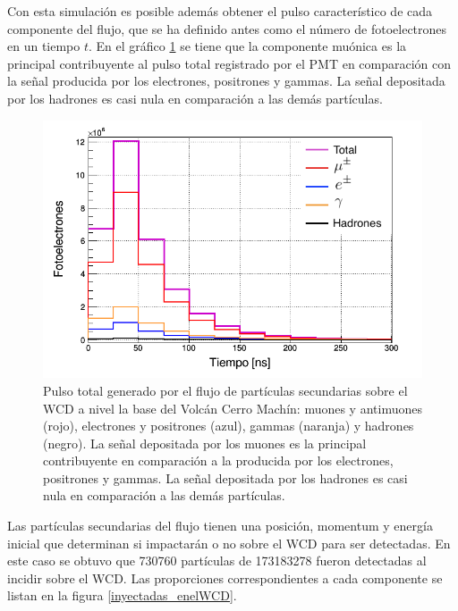 \documentclass[12pt,oneside,openany,letter]{book}
\begin{document}
Con esta simulación es posible además obtener el pulso característico de cada componente del flujo, que se ha definido antes como el número de fotoelectrones en un tiempo $t$. En el gráfico \ref{pulso_flujo} se tiene que la componente muónica es la principal contribuyente al pulso total registrado por el PMT en comparación con la señal producida por los electrones, positrones y gammas. La señal depositada por los hadrones es casi nula en comparación a las demás partículas.
\begin{figure}[h]
\centering
\includegraphics[scale=0.45]{images/pulso_flujo.png}
\caption[Pulso total generado por el flujo de partículas secundarias sobre el WCD a nivel del Volcán Cerro Machín]{
Pulso total generado por el flujo de partículas secundarias sobre el WCD a nivel la base del Volcán Cerro Machín: muones y antimuones (rojo), electrones y positrones (azul), gammas (naranja) y hadrones (negro). La señal depositada por los muones es la principal contribuyente en comparación a la producida por los electrones, positrones y gammas. La señal depositada por los hadrones es casi nula en comparación a las demás partículas.
\label{pulso_flujo} }
\end{figure}

Las partículas secundarias del flujo tienen una posición, momentum y energía inicial que determinan si impactarán o no sobre el WCD para ser detectadas. En este caso se obtuvo que 730760 partículas de 173183278 fueron detectadas al incidir sobre el WCD. Las proporciones correspondientes a cada componente se listan en la figura \ref{inyectadas_enelWCD}.
\end{document}
